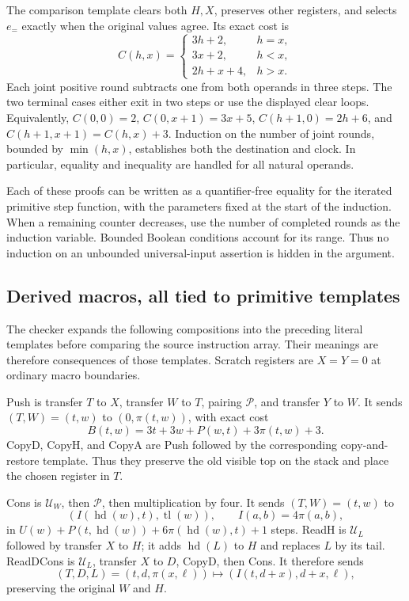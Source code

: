 The comparison template clears both $H,X$, preserves other registers,
and selects $e_=$ exactly when the original values agree.  Its exact cost is
\[
 C(h,x)=
 \begin{cases}
  3h+2,&h=x,\\
  3x+2,&h<x,\\
  2h+x+4,&h>x.
 \end{cases}                                           \tag{C}
\]
Each joint positive round subtracts one from both operands in three
steps.  The two terminal cases either exit in two steps or use the
displayed clear loops.  Equivalently,
$C(0,0)=2$, $C(0,x+1)=3x+5$, $C(h+1,0)=2h+6$, and
$C(h+1,x+1)=C(h,x)+3$.
Induction on the number of joint rounds, bounded by $\min(h,x)$,
establishes both the destination and clock.  In particular, equality
and inequality are handled for all natural operands.

Each of these proofs can be written as a quantifier-free equality for
the iterated primitive step function, with the parameters fixed at the
start of the induction.  When a remaining counter decreases, use the
number of completed rounds as the induction variable.  Bounded Boolean
conditions account for its range.  Thus no induction on an unbounded
universal-input assertion is hidden in the argument.

\subsection{Derived macros, all tied to primitive templates}

The checker expands the following compositions into the preceding literal
templates before comparing the source instruction array.  Their meanings
are therefore consequences of those templates.  Scratch registers are
$X=Y=0$ at ordinary macro boundaries.

Push is transfer $T$ to $X$, transfer $W$ to $T$, pairing $\mathcal P$,
and transfer $Y$ to $W$.  It sends $(T,W)=(t,w)$ to
$(0,\pi(t,w))$, with exact cost
\[
 B(t,w)=3t+3w+P(w,t)+3\pi(t,w)+3.
\]
CopyD, CopyH, and CopyA are Push followed by the corresponding
copy-and-restore template.  Thus they preserve the old visible top on the
stack and place the chosen register in $T$.

Cons is $\mathcal U_W$, then $\mathcal P$, then multiplication by four.
It sends $(T,W)=(t,w)$ to
\[
 (I(\operatorname{hd}(w),t),\operatorname{tl}(w)),\qquad
 I(a,b)=4\pi(a,b),
\]
in $U(w)+P(t,\operatorname{hd}(w))+6\pi(\operatorname{hd}(w),t)+1$
steps.  ReadH is $\mathcal U_L$ followed by transfer $X$ to $H$; it
adds $\operatorname{hd}(L)$ to $H$ and replaces $L$ by its tail.
ReadDCons is $\mathcal U_L$, transfer $X$ to $D$, CopyD, then Cons.
It therefore sends
\[
 (T,D,L)=(t,d,\pi(x,\ell))
 \longmapsto (I(t,d+x),d+x,\ell),
\]
preserving the original $W$ and $H$.


